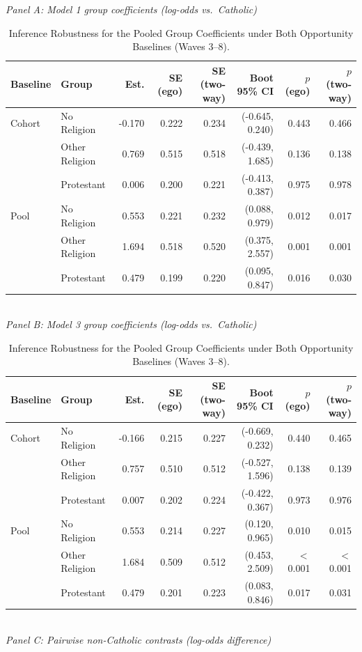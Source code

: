 \begin{table}[htbp]
\caption{\label{tab:inference-robustness}Inference Robustness for the Pooled Group Coefficients under Both Opportunity Baselines (Waves 3--8).}
\centering
\scriptsize
\textit{Panel A: Model 1 group coefficients (log-odds vs.\ Catholic)}\\[2pt]
\begin{tabular}{llrrrrrr}
\toprule
Baseline & Group & Est. & SE (ego) & SE (two-way) & Boot 95\% CI & $p$ (ego) & $p$ (two-way) \\
\midrule
Cohort & No Religion & -0.170 & 0.222 & 0.234 & (-0.645, 0.240) & 0.443 & 0.466 \\
 & Other Religion & 0.769 & 0.515 & 0.518 & (-0.439, 1.685) & 0.136 & 0.138 \\
 & Protestant & 0.006 & 0.200 & 0.221 & (-0.413, 0.387) & 0.975 & 0.978 \\
Pool & No Religion & 0.553 & 0.221 & 0.232 & (0.088, 0.979) & 0.012 & 0.017 \\
 & Other Religion & 1.694 & 0.518 & 0.520 & (0.375, 2.557) & 0.001 & 0.001 \\
 & Protestant & 0.479 & 0.199 & 0.220 & (0.095, 0.847) & 0.016 & 0.030 \\
\bottomrule
\end{tabular}
\\[8pt]
\textit{Panel B: Model 3 group coefficients (log-odds vs.\ Catholic)}\\[2pt]
\begin{tabular}{llrrrrrr}
\toprule
Baseline & Group & Est. & SE (ego) & SE (two-way) & Boot 95\% CI & $p$ (ego) & $p$ (two-way) \\
\midrule
Cohort & No Religion & -0.166 & 0.215 & 0.227 & (-0.669, 0.232) & 0.440 & 0.465 \\
 & Other Religion & 0.757 & 0.510 & 0.512 & (-0.527, 1.596) & 0.138 & 0.139 \\
 & Protestant & 0.007 & 0.202 & 0.224 & (-0.422, 0.367) & 0.973 & 0.976 \\
Pool & No Religion & 0.553 & 0.214 & 0.227 & (0.120, 0.965) & 0.010 & 0.015 \\
 & Other Religion & 1.684 & 0.509 & 0.512 & (0.453, 2.509) & $<$0.001 & $<$0.001 \\
 & Protestant & 0.479 & 0.201 & 0.223 & (0.083, 0.846) & 0.017 & 0.031 \\
\bottomrule
\end{tabular}
\\[8pt]
\textit{Panel C: Pairwise non-Catholic contrasts (log-odds difference)}\\[2pt]

\end{table}
